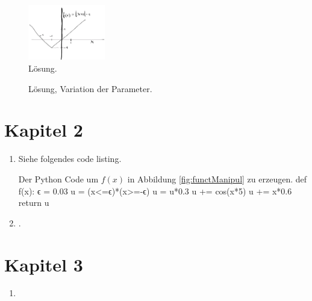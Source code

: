 \begin{figure}[h]
    \centering
    \includegraphics[width=0.3\textwidth]{img/loesung_abs.png}
    \caption{Lösung. }
    \label{fig:Loes_abs}
\end{figure}

\begin{figure}[h]
    \centering
    
    \caption{Lösung, Variation der Parameter.}
    \label{fig:Loes_abs_var}
\end{figure}



\section{Kapitel 2}
\begin{enumerate}
\item Siehe folgendes code listing.
\begin{python}{Der Python Code um $f(x)$ in Abbildung \ref{fig:functManipul} zu erzeugen.}
def f(x):
    ϵ = 0.03
    u = (x<=ϵ)*(x>=-ϵ)
    u = u*0.3
    u += cos(x*5)
    u += x*0.6
    return u

\end{python}
\item {}.

\end{enumerate}

\section{Kapitel 3}
\begin{enumerate}
\item
\end{enumerate}

